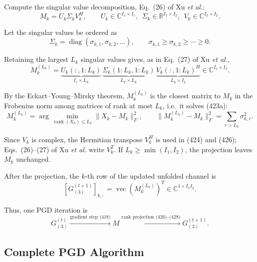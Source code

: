 \documentclass[12pt,a4paper]{article}
\begin{document}
Compute the singular value decomposition, Eq.~(26) of Xu \emph{et al.}:
\begin{equation}
\boxed{
M_k
=
U_k\Sigma_kV_k^{H},
\qquad
U_k\in\mathbb C^{I_1\times I_1},
\ \
\Sigma_k\in\mathbb R^{I_1\times I_2},
\ \
V_k\in\mathbb C^{I_2\times I_2}.
}
\tag{424}
\end{equation}

Let the singular values be ordered as
\begin{equation}
\Sigma_k
=\operatorname{diag}(\sigma_{k,1},\sigma_{k,2},\ldots),
\qquad
\sigma_{k,1}\geq\sigma_{k,2}\geq\cdots\geq0.
\tag{425}
\end{equation}

Retaining the largest $L_k$ singular values gives, as in Eq.~(27) of
Xu \emph{et al.},
\begin{equation}
\boxed{
M_k^{(L_k)}
=
\underbrace{U_k(:,1:L_k)}_{I_1\times L_k}\,
\underbrace{\Sigma_k(1:L_k,1:L_k)}_{L_k\times L_k}\,
\underbrace{V_k(:,1:L_k)^H}_{L_k\times I_2}
\in\mathbb C^{I_1\times I_2}.
}
\tag{426}
\end{equation}

By the Eckart--Young--Mirsky theorem, $M_k^{(L_k)}$ is the closest
matrix to $M_k$ in the Frobenius norm among matrices of rank at most
$L_k$, i.e.\ it solves (423a):
\begin{equation}
\boxed{
M_k^{(L_k)}
=
\arg\min_{\operatorname{rank}(X_k)\leq L_k}
\|X_k-M_k\|_F^2,
\qquad
\|M_k^{(L_k)}-M_k\|_F^2=\sum_{r>L_k}\sigma_{k,r}^2.
}
\tag{427}
\end{equation}

Since $V_k$ is complex, the Hermitian transpose $V_k^H$ is used in
(424) and (426); Eqs.~(26)--(27) of Xu \emph{et al.} write $V_k^T$. If
$L_k\geq\min(I_1,I_2)$, the projection leaves $M_k$ unchanged.

After the projection, the $k$-th row of the updated unfolded channel is
\begin{equation}
\boxed{
[G_{(3)}^{(t+1)}]_{k,:}
=
\operatorname{vec}(M_k^{(L_k)})^T
\in\mathbb C^{1\times I_1I_2}.
}
\tag{428}
\end{equation}

Thus, one PGD iteration is
\begin{equation}
\boxed{
G_{(3)}^{(t)}
\xrightarrow{\text{gradient step (418)}}
M
\xrightarrow{\text{rank projection (426)--(428)}}
G_{(3)}^{(t+1)}.
}
\tag{429}
\end{equation}

\subsection{Complete PGD Algorithm}
\end{document}
